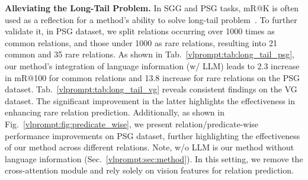 \noindent \textbf{Alleviating the Long-Tail Problem.}
In SGG and PSG tasks, mR@K is often used as a reflection for a method's ability to solve long-tail problem~\citep{tang2020unbiased}.
To further validate it, in PSG dataset, we split relations occurring over 1000 times as common relations, and those under 1000 as rare relations, resulting into 21 common and 35 rare relations.
As shown in Tab.~\ref{vlprompt:tab:long_tail_psg}, our method's integration of language information (w/ LLM) leads to 2.3 increase in mR@100 for common relations and 13.8 increase for rare relations on the PSG dataset.
Tab.~\ref{vlprompt:tab:long_tail_vg} reveals consistent findings on the VG dataset.
The significant improvement in the latter highlights the effectiveness in enhancing rare relation prediction.
Additionally, as shown in Fig.~\ref{vlprompt:fig:predicate_wise}, we present relation/predicate-wise performance improvements on PSG dataset, further highlighting the effectiveness of our method across different relations.
Note, w/o LLM is our method without language information (Sec.~\ref{vlprompt:sec:method}).
In this setting, we remove the cross-attention module and rely solely on vision features for relation prediction.

\begin{table}[!t]
    \centering
    \setlength{\tabcolsep}{2.0mm}
    \caption{Alleviating the long-tail problem on PSG dataset.
    Incorporating LLM-based language information boosts performance on common and rare relations, with greater gains for rare ones, validating its effectiveness in addressing the long-tail problem.}
    \label{vlprompt:tab:long_tail_psg}
\end{table}


\begin{table}[!t]
    \centering
    \setlength{\tabcolsep}{2.0mm}
    \caption{Alleviating the long-tail problem on VG dataset.}
    \label{vlprompt:tab:long_tail_vg}
\end{table}




